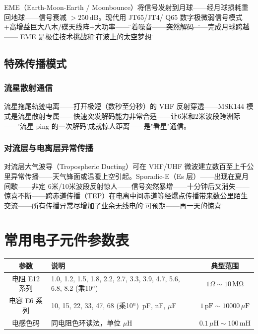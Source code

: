 \documentclass[12pt,UTF8]{ctexbook}
\begin{document}
EME（Earth-Moon-Earth / Moonbounce）将信号发射到月球——经月球损耗重回地球——信号衰减 $>250\,\mathrm{dB}$。现代用 JT65/JT4/ Q65 数字极微弱信号模式+高增益巨大八木/碟天线阵+大功率——\"听着噪音——突然解码\"——完成月球跨越—— EME 是极佳技术挑战和\"写在波上的太空梦想\"。

\section{特殊传播模式}
\label{sec:ham_special_propagation}

\subsection{流星散射通信}

流星拖尾轨迹电离——打开极短（数秒至分秒）的 VHF 反射穿透——MSK144 模式是流星散射专属——快速突发解码能力非常合适——让6米和2米波段跨洲际——'流星 ping 的一次解码'成就惊人距离——是"看星"通信。

\subsection{对流层与电离层异常传播}

对流层大气波导（Tropospheric Ducting）可在 VHF/UHF 微波建立数百至上千公里异常传播——天气锋面或温暖上空引起。Sporadic-E（Es 层）——出现在夏月间歇——非定 6米/10米波段反射惊人——信号突然暴增——十分钟后又消失——惊喜不断——跨赤道传播（TEP）在电离中间赤道等经爆点传播带来数公里陌生交流——所有传播异常尽增加了业余无线电的\"不可预期——再一天的惊喜\"。


\backmatter

\appendix

\chapter{常用电子元件参数表}

\begin{center}
\begin{tabular}{c|l|c}
\hline
\textbf{参数} & \textbf{说明} & \textbf{典型范围} \\
\hline
电阻 E12 系列 & 1.0, 1.2, 1.5, 1.8, 2.2, 2.7, 3.3, 3.9, 4.7, 5.6, 6.8, 8.2 (乘10$^n$) & $1\Omega\sim10\,\mathrm{M\Omega}$ \\
电容 E6 系列 & 10, 15, 22, 33, 47, 68 (乘10$^n$)\ pF, nF, $\mu$F & $1\,\mathrm{pF}\sim10000\,\mu\mathrm{F}$ \\
电感色码 & 同电阻色环读法，单位 $\mu\mathrm{H}$ & $0.1\,\mu\mathrm{H}\sim100\,\mathrm{mH}$ \\
\hline
\end{tabular}
\end{center}
\end{document}
